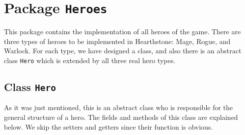 \documentclass[a4paper]{article}
\begin{document}
\clearpage
\section{Package \texttt{Heroes}}
This package contains the implementation of all heroes of the game. There are three types of heroes to be implemented in Hearthstone: Mage, Rogue, and Warlock. For each type, we have designed a class, and also there is an abstract class \texttt{Hero} which is extended by all three real hero types.
\subsection{Class \texttt{Hero}}
As it was just mentioned, this is an abstract class who is responsible for the general structure of a hero. The fields and methods of this class are explained below. We skip the setters and getters since their function is obvious.
\end{document}
